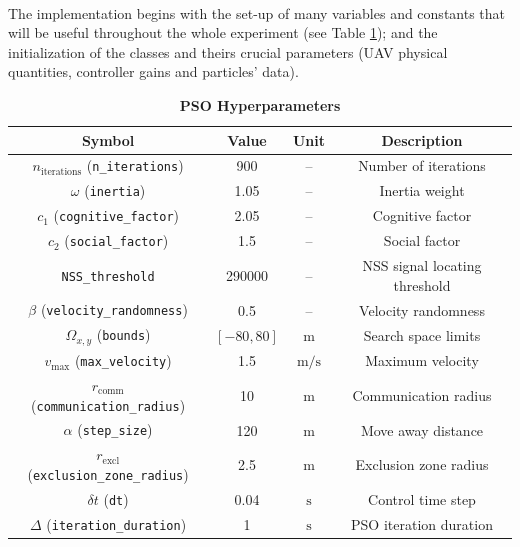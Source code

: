 \documentclass[main]{subfiles}
\begin{document}
\noindent\\
The implementation begins with the set-up of 
many variables and constants that will be useful throughout 
the whole experiment (see Table \ref{tab:pso_parameters}); and the initialization of the classes and theirs
crucial parameters (UAV physical quantities, controller gains and 
particles' data).
\begin{table}
\centering
\caption{\textbf{PSO Hyperparameters}}
\begin{tabular}{c c c c}
\hline\hline
\textbf{Symbol}              & \textbf{Value}        & \textbf{Unit}           & \textbf{Description}      \\ \hline\hline                   
\(n_{\text{iterations}}\) (\texttt{n\_iterations})     & 900                   & --                      & Number of iterations      \\
\(\omega\) (\texttt{inertia})                          & 1.05                  & --                      & Inertia weight            \\
\(c_1\) (\texttt{cognitive\_factor})                   & 2.05                  & --                      & Cognitive factor          \\
\(c_2\) (\texttt{social\_factor})                      & 1.5                   & --                      & Social factor             \\
 \texttt{NSS\_threshold}                               & 290000                & --                      & NSS signal locating threshold\\
\(\beta\) (\texttt{velocity\_randomness})              & 0.5                   & --                      & Velocity randomness       \\ \hline
\(\Omega_{x,y}\) (\texttt{bounds})                     & \([-80, 80]\)         & \(\text{m}\)            & Search space limits       \\
\(v_{\text{max}}\) (\texttt{max\_velocity})            & 1.5                   & \(\text{m/s}\)          & Maximum velocity          \\                
\(r_{\text{comm}}\) (\texttt{communication\_radius})   & 10                    & \(\text{m}\)           & Communication radius      \\
\(\alpha\) (\texttt{step\_size})                       & 120                   & \(\text{m}\)           & Move away distance        \\
\(r_{\text{excl}}\) (\texttt{exclusion\_zone\_radius}) & 2.5                   & \(\text{m}\)           & Exclusion zone radius     \\
\(\delta t\) (\texttt{dt})                             & 0.04                  & \(\text{s}\)           & Control time step         \\
\(\Delta\) (\texttt{iteration\_duration})              & 1                     & \(\text{s}\)           & PSO iteration duration    \\
\hline\hline
\end{tabular}
\label{tab:pso_parameters}
\end{table}
\end{document}
